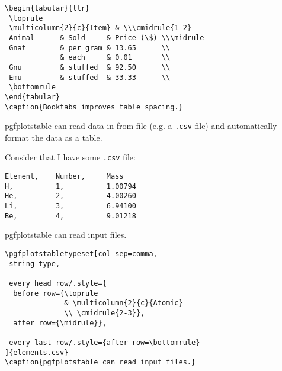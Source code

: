\begin{frame}[fragile]{}
  	\begin{lstlisting}
\begin{tabular}{llr}
 \toprule
 \multicolumn{2}{c}{Item} & \\\cmidrule{1-2}
 Animal      & Sold     & Price (\$) \\\midrule
 Gnat        & per gram & 13.65      \\
             & each     & 0.01       \\
 Gnu         & stuffed  & 92.50      \\
 Emu         & stuffed  & 33.33      \\
 \bottomrule
\end{tabular}
\caption{Booktabs improves table spacing.}
  	\end{lstlisting}
\end{frame}

\begin{frame}[fragile]{}
pgfplotstable can read data in from file (e.g. a \texttt{.csv} file) and
automatically format the data as a table.

Consider that I have some \texttt{.csv} file:
\begin{lstlisting}
Element,    Number,     Mass
H,          1,          1.00794
He,         2,          4.00260
Li,         3,          6.94100
Be,         4,          9.01218
\end{lstlisting}
\end{frame}

\begin{frame}{}
  \begin{table}
  	\caption{pgfplotstable can read input files.}
  \end{table}
\end{frame}

\begin{frame}[fragile]{}
  \begin{lstlisting}
\pgfplotstabletypeset[col sep=comma,
 string type,

 every head row/.style={
  before row={\toprule
              & \multicolumn{2}{c}{Atomic}
              \\ \cmidrule{2-3}},
  after row={\midrule}},
 
 every last row/.style={after row=\bottomrule}
]{elements.csv}
\caption{pgfplotstable can read input files.}
  \end{lstlisting}
\end{frame}

